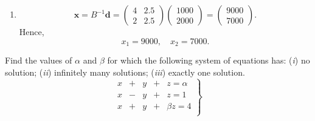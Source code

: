 \documentclass[11pt]{exam}
\begin{document}
\begin{questions}
\begin{solution}
\begin{enumerate}[leftmargin=0.55cm, label=(\alph*), rightmargin=0.2cm]
\item
\[
\mathbf{x}=B^{-1}\mathbf{d}
=\begin{pmatrix}4&2.5\\[2pt]2&2.5\end{pmatrix}
\begin{pmatrix}1000\\2000\end{pmatrix}
=\begin{pmatrix}9000\\7000\end{pmatrix}.
\]
Hence,
\[
x_1=9000,\quad x_2=7000.
\]

\end{enumerate}
\end{solution}


\question[2]
    Find the values of $\alpha$ and $\beta$ for which the following system of equations has: (\textit{i}) no solution; (\textit{ii}) infinitely many solutions; (\textit{iii}) exactly one solution.
    \begin{equation*}
        \left.
        \begin{alignedat}{4}
             x & {}+{} & y & {}+{} & z = \alpha \\
             x & {}-{} & y & {}+{} & z = 1 \\
             x & {}+{} & y & {}+{} & \beta z = 4 \\
        \end{alignedat}
        \right\}
    \end{equation*}


\end{questions}
\end{document}
